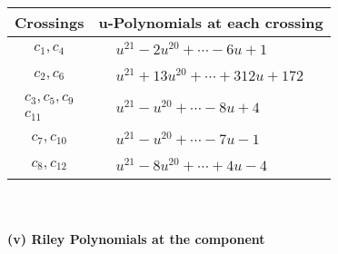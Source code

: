 \documentclass[1p]{elsarticle_modified}
\theoremstyle{definition}
\begin{document}
\begin{tabular}{m{50pt}|m{274pt}}
Crossings & \hspace{64pt}u-Polynomials at each crossing \\
\hline $$\begin{aligned}c_{1},c_{4}\end{aligned}$$&$\begin{aligned}
&u^{21}-2 u^{20}+\cdots-6 u+1
\end{aligned}$\\
\hline $$\begin{aligned}c_{2},c_{6}\end{aligned}$$&$\begin{aligned}
&u^{21}+13 u^{20}+\cdots+312 u+172
\end{aligned}$\\
\hline $$\begin{aligned}c_{3},c_{5},c_{9}\\c_{11}\end{aligned}$$&$\begin{aligned}
&u^{21}- u^{20}+\cdots-8 u+4
\end{aligned}$\\
\hline $$\begin{aligned}c_{7},c_{10}\end{aligned}$$&$\begin{aligned}
&u^{21}- u^{20}+\cdots-7 u-1
\end{aligned}$\\
\hline $$\begin{aligned}c_{8},c_{12}\end{aligned}$$&$\begin{aligned}
&u^{21}-8 u^{20}+\cdots+4 u-4
\end{aligned}$\\
\hline
\end{tabular}\\~\\
\newpage\renewcommand{\arraystretch}{1}
\flushleft \textbf{(v) Riley Polynomials at the component}\newline \\
\end{document}
